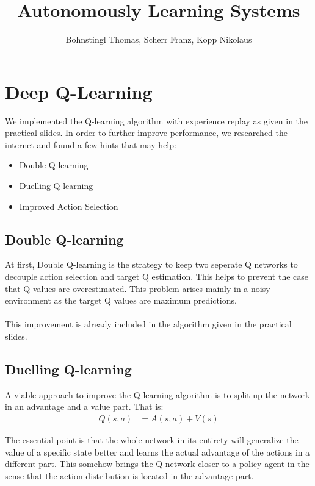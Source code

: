 \documentclass[10pt,a4paper]{article}
\author{Bohnstingl Thomas, Scherr Franz, Kopp Nikolaus}
\title{Autonomously Learning Systems}
\begin{document}
\newcommand{\identity}{\mathbf{I}}
\newcommand{\Xmat}{\mathbf{X}}
\newcommand{\yvec}{\mathbf{y}}
\renewcommand{\th}{\theta}
\newcommand{\dthi}{\frac{\partial}{\partial \th_i}}
\newcommand{\dthj}{\frac{\partial}{\partial \th_j}}

 

\section{Deep Q-Learning}

We implemented the Q-learning algorithm with experience replay as given in the practical slides. In order to further improve performance, we researched the internet and found a few hints that may help:

\begin{itemize}
  \item Double Q-learning
  \item Duelling Q-learning
  \item Improved Action Selection
\end{itemize}

\subsection{Double Q-learning}
At first, Double Q-learning is the strategy to keep two seperate Q networks to decouple action selection and target Q estimation. This helps to prevent the case that Q values are overestimated. This problem arises mainly in a noisy environment as the target Q values are maximum predictions. \\
\\
This improvement is already included in the algorithm given in the practical slides.

\subsection{Duelling Q-learning}
A viable approach to improve the Q-learning algorithm is to split up the network in an advantage and a value part. That is:
\begin{align*}
  Q(s, a) &= A(s, a) + V(s)
\end{align*}

The essential point is that the whole network in its entirety will generalize the value of a specific state better and learns the actual advantage of the actions in a different part. This somehow brings the Q-network closer to a policy agent in the sense that the action distribution is located in the advantage part.
\end{document}
